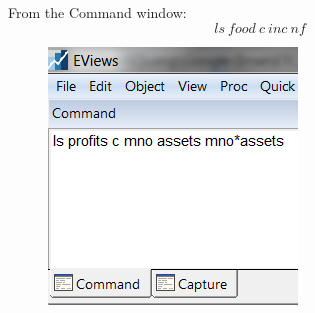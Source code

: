 \documentclass[12pt]{report}
\begin{document}
\noindent From the Command window:
$$ls\ food\ c\ inc\ nf$$
\begin{figure}[H]
	\centering
	\includegraphics{q1_1}
\end{figure}
\vspace{-\baselineskip}
\end{document}
